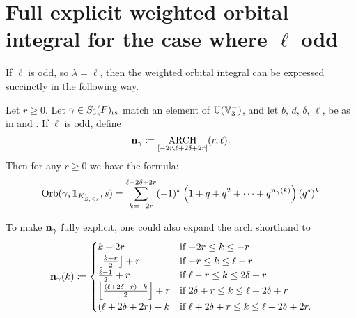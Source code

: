 \section{Full explicit weighted orbital integral for the case where $\ell$ odd}
If $\ell$ is odd, so $\lambda = \ell$, then
the weighted orbital integral can be expressed succinctly in the following way.
\begin{theorem}
  \label{thm:full_orbital_ell_odd}
  Let $r \ge 0$.
  Let $\gamma \in S_3(F)_{\mathrm{rs}}$ match an element of $\operatorname{U}(\mathbb V_3^-)$,
  and let $b$, $d$, $\delta$, $\ell$, be as in
   and .
  If $\ell$ is odd, define
  \[ \mathbf n_\gamma \coloneqq \operatorname*{ARCH}_{[-2r, \ell + 2\delta + 2r]}(r, \ell). \]
  Then for any $r \ge 0$ we have the formula:
  \[
    \operatorname{Orb}(\gamma, \mathbf{1}_{K'_{S, \le r}}, s)
    = \sum_{k = -2r}^{\ell + 2\delta + 2r}
    (-1)^k \left( 1 + q + q^2 + \dots + q^{\mathbf n_{\gamma}(k)}  \right) (q^s)^k
  \]
\end{theorem}
\begin{remark}
  To make $\mathbf n_\gamma$ fully explicit, one could also expand the arch shorthand to
  \[
    \mathbf n_\gamma(k)
    \coloneqq \begin{cases}
      k + 2r & \text{if } {-2r} \le k \le -r \\
      \left\lfloor \frac{k+r}{2} \right\rfloor + r & \text{if }{-r} \le k \le \ell-r \\
      \frac{\ell-1}{2} + r & \text{if } \ell - r \le k \le 2\delta + r \\
      \left\lfloor \frac{(\ell+2\delta+r)-k}{2} \right\rfloor + r & \text{if } 2\delta + r \le k \le \ell + 2\delta + r\\
      (\ell + 2\delta + 2r) - k & \text{if } \ell + 2\delta + r \le k \le \ell + 2\delta + 2r.
    \end{cases} \]
\end{remark}

